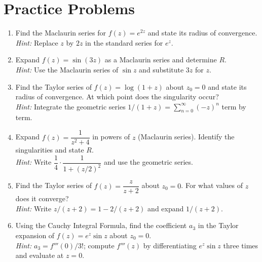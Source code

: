 \documentclass[12pt,a4paper]{article}
\begin{document}
\section{Practice Problems}

\begin{enumerate}[label=\textbf{P\arabic*.}, leftmargin=*, noitemsep]

\item Find the Maclaurin series for $f(z) = e^{2z}$ and state its radius of convergence.\\
\textit{Hint:} Replace $z$ by $2z$ in the standard series for $e^z$.

\item Expand $f(z) = \sin(3z)$ as a Maclaurin series and determine $R$.\\
\textit{Hint:} Use the Maclaurin series of $\sin z$ and substitute $3z$ for $z$.

\item Find the Taylor series of $f(z) = \log(1+z)$ about $z_0=0$ and state its radius of convergence. At which point does the singularity occur?\\
\textit{Hint:} Integrate the geometric series $1/(1+z) = \sum_{n=0}^{\infty}(-z)^n$ term by term.

\item Expand $f(z) = \dfrac{1}{z^2+4}$ in powers of $z$ (Maclaurin series). Identify the singularities and state $R$.\\
\textit{Hint:} Write $\dfrac{1}{4}\cdot\dfrac{1}{1+(z/2)^2}$ and use the geometric series.

\item Find the Taylor series of $f(z) = \dfrac{z}{z+2}$ about $z_0 = 0$. For what values of $z$ does it converge?\\
\textit{Hint:} Write $z/(z+2) = 1 - 2/(z+2)$ and expand $1/(z+2)$.

\item Using the Cauchy Integral Formula, find the coefficient $a_3$ in the Taylor expansion of $f(z) = e^z \sin z$ about $z_0 = 0$.\\
\textit{Hint:} $a_3 = f'''(0)/3!$; compute $f'''(z)$ by differentiating $e^z\sin z$ three times and evaluate at $z=0$.

\end{enumerate}

\end{document}
